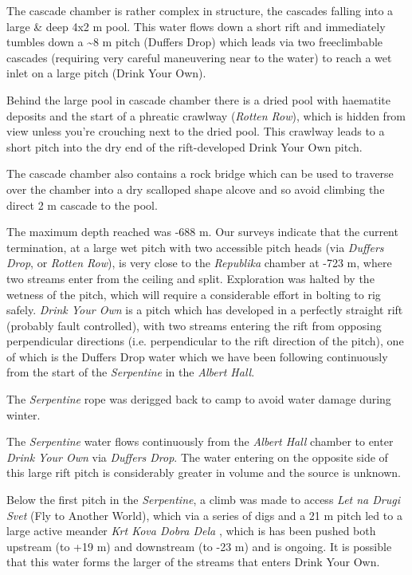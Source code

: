 The cascade chamber is rather complex in structure, the cascades falling
into a large \& deep 4x2 m pool. This water flows down a short rift and
immediately tumbles down a \textasciitilde 8 m pitch (Duffers Drop)
which leads via two freeclimbable cascades (requiring very careful
maneuvering near to the water) to reach a wet inlet on a large pitch
(Drink Your Own).

Behind the large pool in cascade chamber there is a dried pool with
haematite deposits and the start of a phreatic crawlway (\emph{Rotten
Row}), which is hidden from view unless you're crouching next to the
dried pool. This crawlway leads to a short pitch into the dry end of the
rift-developed Drink Your Own pitch.

The cascade chamber also contains a rock bridge which can be used to
traverse over the chamber into a dry scalloped shape alcove and so avoid
climbing the direct 2 m cascade to the pool.

The maximum depth reached was -688 m. Our surveys indicate that the
current termination, at a large wet pitch with two accessible pitch
heads (via \emph{Duffers Drop}, or \emph{Rotten Row}), is very close to
the \emph{Republika} chamber at -723 m, where two streams enter from the
ceiling and split. Exploration was halted by the wetness of the pitch,
which will require a considerable effort in bolting to rig safely.
\emph{Drink Your Own} is a pitch which has developed in a perfectly
straight rift (probably fault controlled), with two streams entering the
rift from opposing perpendicular directions (i.e. perpendicular to the
rift direction of the pitch), one of which is the Duffers Drop water
which we have been following continuously from the start of the
\emph{Serpentine} in the \emph{Albert Hall}.

The \emph{Serpentine} rope was derigged back to camp to avoid water
damage during winter.

The \emph{Serpentine} water flows continuously from the \emph{Albert
Hall} chamber to enter \emph{Drink Your Own} via \emph{Duffers Drop}.
The water entering on the opposite side of this large rift pitch is
considerably greater in volume and the source is unknown.

Below the first pitch in the \emph{Serpentine}, a climb was made to
access \emph{Let na Drugi Svet} (Fly to Another World), which via a
series of digs and a 21 m pitch led to a large active meander \emph{Krt
Kova Dobra Dela} , which is has been
pushed both upstream (to +19 m) and downstream (to -23 m) and is
ongoing. It is possible that this water forms the larger of the streams
that enters Drink Your Own.


